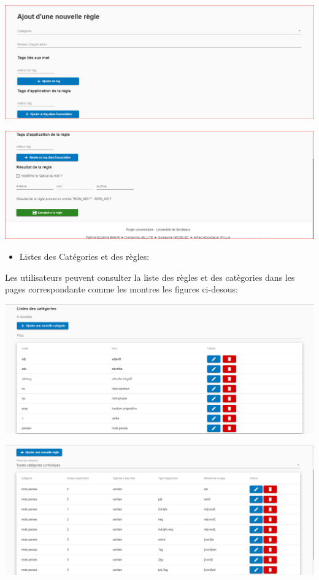\documentclass[12pt,a4paper]{article}
\begin{document}
 \includegraphics[width=150mm]{img/AjouterReg1.PNG}
 
 
 \includegraphics[width=150mm]{img/AjouterReg2.PNG}



\begin{itemize}  
  \item Listes des Catégories et des règles:
\end{itemize}
Les utilisateurs peuvent consulter la liste des règles et des catègories dans les pages correspondante comme les montres les figures ci-desous: 


 \includegraphics[width=150mm]{img/GestionCat.PNG}


 \includegraphics[width=150mm]{img/GestionReg.PNG}
\end{document}
